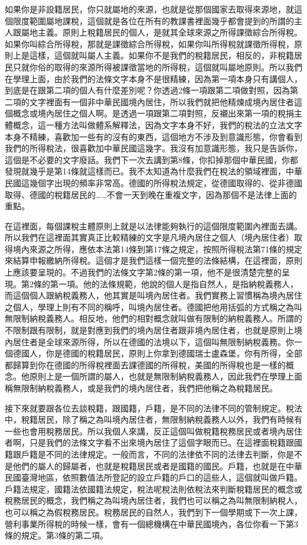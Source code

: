\documentclass[]{ctexbook}
\begin{document}
如果你是非設籍居民，你只就屬地的來源，也就是從那個國家去取得來源地，就這個限度範圍屬地課稅，這個就是各位在所有的教課書裡面幾乎都會提到的所謂的主人跟屬地主義。原則上稅籍居民的個人，是就其全球來源之所得課徵綜合所得稅。如果你叫綜合所得稅，那就是課徵綜合所得稅，如果你叫所得稅就課徵所得稅，原則上是這樣，這個就叫屬人主義。如果你不是我們的稅籍居民，相反的，非稅籍居民只就你俗的取得的來源所得被課徵當地的所得稅，這個就叫屬地原則。所以我們在學理上面，由於我們的法條文字本身不是很精練，因為第一項本身只有講個人，到底是在跟第二項的個人有什麼差別呢？你透過2條一項跟第二項做對照，因為第二項的文字裡面有一個非中華民國境內居住，所以我們就把他精煉成境內居住者這個概念或境內居住之個人啊。是透過一項跟第二項對照，反襯出來第一項的稅捐主體概念，這一種方法叫做體系解釋法，因為文字本身不好，我們的稅法的立法文字本身不精練，喜歡加一些有的沒有的東西，這個地方不涉及到意識形態，你會看到我們的所得稅法，很喜歡加中華民國這幾字。我沒有加意識形態，我只是告訴你，這個是不必要的文字廢話。我們下一次去講到第8條，你扣掉那個中華民國，你都發現就幾乎是第14條就這樣而已。我不太知道為什麼我們在稅法的領域裡面，中華民國這幾個字出現的頻率非常高。德國的所得稅法規定，從德國取得的、從非德國取得、德國的稅籍居民的\ldots\ldots 不會一天到晚在重複文字，因為那個不是法律上面的重點。

在這裡面，每個課稅主體原則上就是以法律能夠執行的這個限度範圍內裡面去講。所以我們在這裡面其實真正比較精練的文字是凡境內居住之個人（境內居住者）取得境內來源之所得，應依本法第14條到第17條之規定，按照所得稅法第71條的規定來結算申報繳納所得稅。這個才是我們這樣一個完整的法條結構，在這裡面，原則上應該要呈現的。不過我們的法條文字第2條的第一項，他不是很清楚完整的呈現。第2條的第一項。他的法條規範，他說的個人是指自然人，是指納稅義務人，而這個個人跟納稅義務人，他其實是叫境內居住者。我們實務上習慣稱為境內居住之個人，學理上則有不同的稱呼，叫境內居住者。德國把他用括弧的方式稱之為叫無限制納稅義務人。相反地，他們的相對概念就叫做有限制的納稅義務人。所謂的不限制跟有限制，就是對應到我們的境內居住者跟非境內居住者，也就是原則上境內居住者是全球來源所得，所以在德國的法境以下，這個叫無限制納稅義務。你一個德國人，你是德國的稅籍居民，原則上你拿到德國瑞士盧森堡，你有所得，全部都歸算到你在德國的所得稅裡面去課德國的所得稅，美國的所得稅也是一樣的概念。他原則上是一個所謂的屬人，也就是無限制納稅義務人，因此我們在學理上面稱無限制納稅義務人，或是我們的境內居住者，我們把他稱之為稅籍居民。

接下來就要跟各位去談稅籍，跟國籍，戶籍，是不同的法律不同的管制規定。稅法中，稅籍居民，除了稱之為叫境內居住者，無限制納稅義務人以外，我們有時候有一些也會用稅務居民。所以我個人來講，反正這個叫做稅籍稅務居民或者境內居住者啊，只是我們的法條文字看不出來境內居住了這個字眼而已。在這裡面稅籍跟國籍跟戶籍是不同的法律規定。一般而言，不同的法律依不同的法律去判斷，你是不是他們的屬人的歸屬者，也就是稅籍居民或者是國籍的國民。戶籍，也就是在中華民國臺灣地區，依照數值法所登記的設立戶籍的戶口的這些人，這個就叫做戶籍。戶籍法規定，國籍法依國籍法規定，稅法呢稅法則依稅法來判斷稅籍居民的概念或稅務居民的概念，我們稱之為叫境內居住者，我們也可以稱之為叫無限制納稅人，也可以稱之為假稅務居民。稅務居民的自然人，我們到下一個學期或下一次上課，營利事業所得稅的時候一樣，會有一個總機構在中華民國境內，各位你看一下第3條的規定。第3條的第二項。
\end{document}
